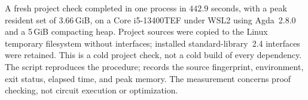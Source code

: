 A fresh project check completed in one process in $442.9$ seconds,
with a peak resident set of $3.66$\,GiB, on a Core i5-13400TEF under
WSL2 using Agda~2.8.0 and a 5\,GiB compacting heap.
Project sources were copied to the Linux temporary filesystem without
interfaces; installed standard-library~2.4 interfaces were retained.
This is a cold project check, not a cold build of every dependency.
The script  reproduces the procedure;
 records the source fingerprint,
environment, exit status, elapsed time, and peak memory. The measurement
concerns proof checking, not circuit execution or optimization.
